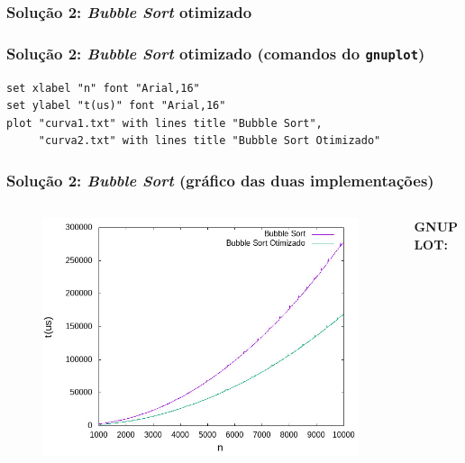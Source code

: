 \documentclass[aspectratio=169]{beamer}
\begin{document}
\begin{frame}[fragile]\frametitle{Solução 2: \emph{Bubble Sort} otimizado}
{\scriptsize}
\end{frame}

\begin{frame}[fragile]\frametitle{Solução 2: \emph{Bubble Sort} otimizado (comandos do \texttt{gnuplot})}
\begin{verbatim}
set xlabel "n" font "Arial,16"
set ylabel "t(us)" font "Arial,16"
plot "curva1.txt" with lines title "Bubble Sort",
     "curva2.txt" with lines title "Bubble Sort Otimizado"
\end{verbatim}
\end{frame}

\begin{frame}[fragile]\frametitle{Solução 2: \emph{Bubble Sort} (gráfico das duas implementações)}
\vspace{-5mm}
\begin{columns}[T]
\begin{column}{0.6\linewidth}
\begin{figure}[h]
	\centering
	\includegraphics[height=0.75\paperheight]{bubble_sort/grafico2.jpg}
\end{figure}
\end{column}
\begin{column}{0.4\linewidth}
\vspace{5mm}
{\fontsize{0}{4}\selectfont{}\textbf{GNUPLOT:}

}
\end{column}
\end{columns}
\end{frame}
\end{document}

